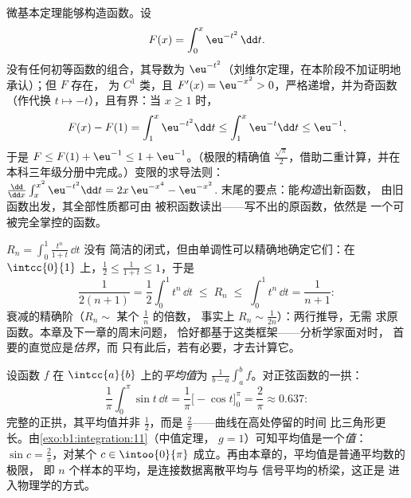 \begin{example}[由积分定义的函数]\label{ex:b1:integration:definedby}
微基本定理能够构造函数。设
\[
F(x) = \int_0^x \eu^{-t^2}\,\dd t .
\]
没有任何初等函数的组合，其导数为
$\eu^{-t^2}$（刘维尔定理，在本阶段不加证明地承认）；但 $F$ 存在，
为 $C^1$ 类，且 $F'(x) = \eu^{-x^2} > 0$，严格递增，并为奇函数
（作代换 $t \mapsto -t$），且有界：当 $x \geq 1$ 时，
\[
F(x) - F(1) = \int_1^x \eu^{-t^2}\dd t
\leq \int_1^x \eu^{-t}\dd t \leq \eu^{-1} ,
\]
于是 $F \leq F(1) + \eu^{-1} \leq 1 + \eu^{-1}$。（极限的精确值
$\frac{\sqrt\pi}{2}$，借助二重计算，并在
本科三年级分册中完成。）变限的求导法则：$\frac{\dd}{\dd
x}\int_x^{x^2} \eu^{-t^2}\dd t = 2x\,\eu^{-x^4} - \eu^{-x^2}$.
末尾的要点：能\emph{构造}出新函数，
由旧函数出发，其全部性质都可由
被积函数读出——写不出的原函数，依然是
一个可被完全掌控的函数。
\end{example}

\begin{example}[不计算而估计]\label{ex:b1:integration:estimate}
 $R_n = \int_0^1 \frac{t^n}{1 + t}\,\dd t$ 没有
简洁的闭式，但由单调性可以精确地确定它们：在
$\intcc{0}{1}$ 上，$\frac12 \leq \frac{1}{1+t} \leq 1$，于是
\[
\frac{1}{2(n+1)} = \frac12\int_0^1 t^n\,\dd t
\;\leq\; R_n \;\leq\; \int_0^1 t^n \,\dd t = \frac{1}{n+1} :
\]
衰减的精确阶（$R_n \sim$ 某个 $\frac1n$ 的倍数，
事实上 $R_n \sim \frac{1}{2n}$）：两行推导，无需
求原函数。本章及下一章的周末问题，
恰好都基于这类框架——分析学家面对时，
首要的直觉应是\emph{估界}，而
只有此后，若有必要，才去计算它。
\end{example}

\begin{example}[平均值]\label{ex:b1:integration:average}
设函数 $f$ 在 $\intcc{a}{b}$ 上的\emph{平均值}为
$\frac{1}{b-a}\int_a^b f$。对正弦函数的一拱：
\[
\frac{1}{\pi}\int_0^\pi \sin t\,\dd t
= \frac{1}{\pi}\bigl[-\cos t\bigr]_0^\pi = \frac{2}{\pi}
\approx 0.637 :
\]
完整的正拱，其平均值并非 $\frac12$，而是
$\frac2\pi$——曲线在高处停留的时间
比三角形更长。由\cref{exo:b1:integration:11}（中值定理，
$g = 1$）可知平均值是一个\emph{值}：$\sin c =
\frac2\pi$，对某个 $c \in \intoo{0}{\pi}$ 成立。再由本章的，平均值是普通平均数的极限，
即 $n$ 个样本的平均，是连接数据离散平均与
信号平均的桥梁，这正是
进入物理学的方式。
\end{example}

